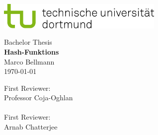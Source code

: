 \begin{titlepage}
    \vspace*{-2cm}
    \newlength{\links}
    \setlength{\links}{-1.5cm}
    \sffamily
    \hspace*{\links}
    \begin{minipage}{12.5cm}
        \includegraphics[width=8cm]{bilder/tud_logo_rgb}
    \end{minipage}

    \vspace*{4cm}

    \hspace*{\links}
    \hspace*{-0.2cm}
    \begin{minipage}{9cm}
        \large
        \begin{center}
            {\Large Bachelor Thesis} \\
            \vspace*{1cm}
            \textbf{Hash-Funktions} \\
            \vspace*{1cm}
            Marco Bellmann\\
            { \today}
        \end{center}
    \end{minipage}
    \normalsize
    \vspace*{5.5cm}


    \vspace*{2.1cm}

    \hspace*{\links}
    \begin{minipage}[b]{5cm}
        \center
        First Reviewer: \\
        Professor Coja-Oghlan \\
        \\
        First Reviewer: \\
        Arnab Chatterjee \\
    \end{minipage}


\end{titlepage}

